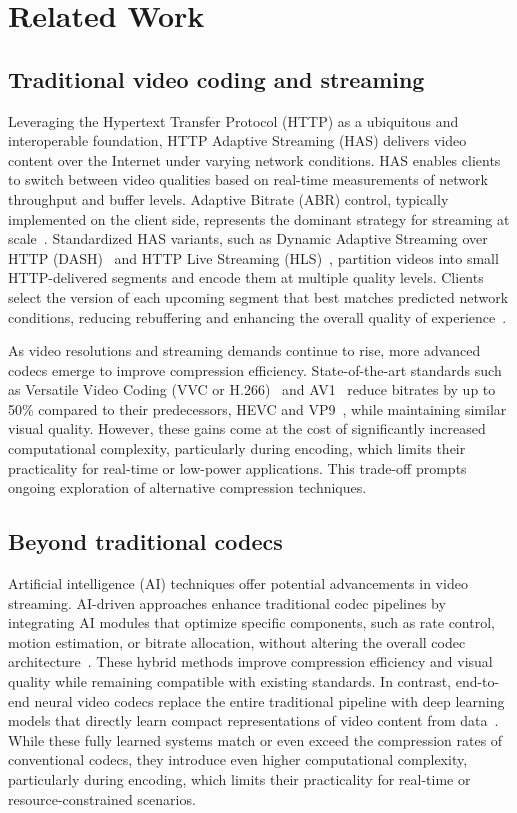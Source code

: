 \documentclass[manuscript, screen]{acmart}
\begin{document}
\section{Related Work}

\subsection{Traditional video coding and streaming}
Leveraging the Hypertext Transfer Protocol (HTTP) as a ubiquitous and interoperable foundation, HTTP Adaptive Streaming (HAS) delivers video content over the Internet under varying network conditions. HAS enables clients to switch between video qualities based on real-time measurements of network throughput and buffer levels. Adaptive Bitrate (ABR) control, typically implemented on the client side, represents the dominant strategy for streaming at scale~\cite{sani2017abr}. Standardized HAS variants, such as Dynamic Adaptive Streaming over HTTP (DASH)~\cite{Stockhammer2011} and HTTP Live Streaming (HLS)~\cite{AppleHLS}, partition videos into small HTTP-delivered segments and encode them at multiple quality levels. Clients select the version of each upcoming segment that best matches predicted network conditions, reducing rebuffering and enhancing the overall quality of experience~\cite{QoEWhitePaper}.

As video resolutions and streaming demands continue to rise, more advanced codecs emerge to improve compression efficiency. State-of-the-art standards such as Versatile Video Coding (VVC or H.266)~\cite{vvc_overview} and AV1~\cite{av1_overview} reduce bitrates by up to 50\% compared to their predecessors, HEVC and VP9~\cite{vp9_overview}, while maintaining similar visual quality. However, these gains come at the cost of significantly increased computational complexity, particularly during encoding, which limits their practicality for real-time or low-power applications. This trade-off prompts ongoing exploration of alternative compression techniques.

\subsection{Beyond traditional codecs}
Artificial intelligence (AI) techniques offer potential advancements in video streaming. AI-driven approaches enhance traditional codec pipelines by integrating AI modules that optimize specific components, such as rate control, motion estimation, or bitrate allocation, without altering the overall codec architecture~\cite{liu2020deep, lu2019dvc}. These hybrid methods improve compression efficiency and visual quality while remaining compatible with existing standards. In contrast, end-to-end neural video codecs replace the entire traditional pipeline with deep learning models that directly learn compact representations of video content from data~\cite{lu2019dvc, chen2021nerv}. While these fully learned systems match or even exceed the compression rates of conventional codecs, they introduce even higher computational complexity, particularly during encoding, which limits their practicality for real-time or resource-constrained scenarios.
\end{document}
